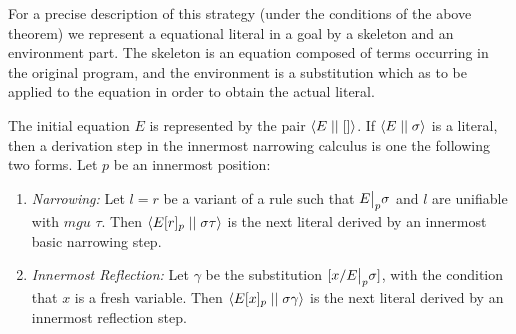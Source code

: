 For a precise description of this strategy (under the conditions of the above theorem) we represent a equational literal in a goal by a skeleton and an environment part. The skeleton is an equation composed of terms occurring in the original program, and the environment is a substitution which as to be applied to the equation in order to obtain  the actual literal.

\begin{definition}
     The initial equation $E$ is represented by the pair $\left\langle E \mid\mid [] \right\rangle$. If $\left\langle E \mid\mid \sigma \right\rangle$ is a literal, then a derivation step in the innermost narrowing calculus is one the following two forms. Let $p$ be an innermost position:
     \begin{enumerate}
         \item \textit{Narrowing:} Let $l = r$ be a variant of a rule such that $\restr{E}{p}\sigma$ and $l$ are unifiable with $mgu$ $\tau$. Then $\left\langle E[r]_p \mid\mid \sigma \tau \right\rangle$ is the next literal derived by an innermost basic narrowing step.
         \item \textit{Innermost Reflection:} Let $\gamma$ be the substitution $[x / \restr{E}{p}\sigma]$, with the condition that $x$ is a fresh variable. Then $\left\langle E[x]_p \mid\mid \sigma \gamma \right\rangle$ is the next literal derived by an innermost reflection step.
     \end{enumerate}
\end{definition}

